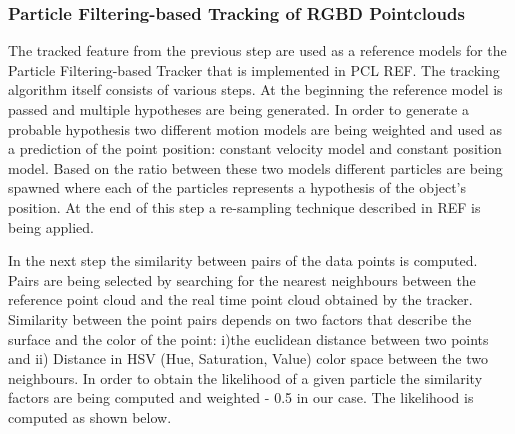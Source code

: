 
\subsubsection{Particle Filtering-based Tracking of RGBD Pointclouds}
\label{sec:tracking}
The tracked feature from the previous step are used as a reference models for the Particle Filtering-based Tracker that is implemented in PCL REF. The tracking algorithm itself consists of various steps. At the beginning the reference model is passed and multiple hypotheses are being generated. In order to generate a probable hypothesis two different motion models are being weighted and used as a prediction of the point position: constant velocity model and constant position model. Based on the ratio between these two models different particles are being spawned where each of the particles represents a hypothesis of the object's position. At the end of this step a re-sampling technique described in REF is being applied. 

In the next step the similarity between pairs of the data points is computed. Pairs are being selected by searching for the nearest neighbours between the reference point cloud and the real time point cloud obtained by the tracker. Similarity between the point pairs depends on two factors that describe the surface and the color of the point: i)the euclidean distance between two points and ii) Distance in HSV (Hue, Saturation, Value) color space between the two neighbours. In order to obtain the likelihood of a given particle the similarity factors are being computed and weighted - 0.5 in our case. The likelihood is computed as shown below.

